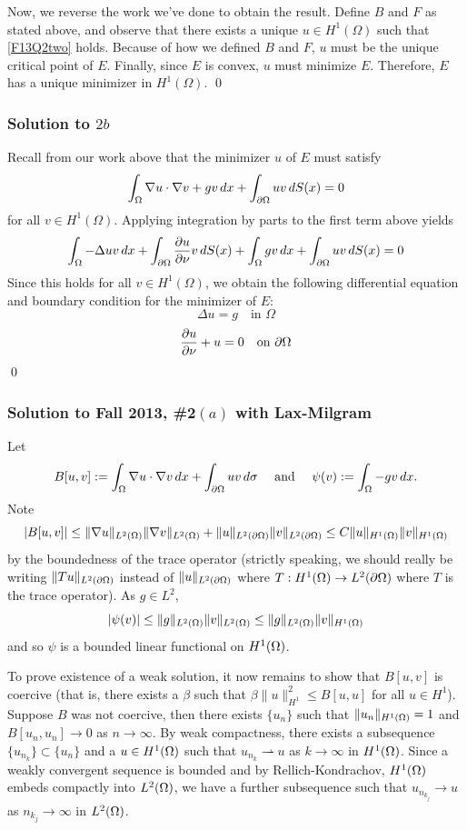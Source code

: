 Now, we reverse the work we've done to obtain the result. Define $B$ and $F$ as stated above, and observe that there exists a unique $u \in H^1(\Omega)$ such that \eqref{F13Q2two} holds. Because of how we defined $B$ and $F$, $u$ must be the unique critical point of $E$. Finally, since $E$ is convex, $u$ must minimize $E$. Therefore, $E$ has a unique minimizer in $H^1(\Omega)$.  \hfill \qed

\subsubsection*{Solution to $2b$}

Recall from our work above that the minimizer $u$ of $E$ must satisfy
$$ \int_{\Omega} \nabla u \cdot \nabla v + gv \,dx + \int_{\partial \Omega} u v \, dS(x) = 0 $$
for all $v \in H^1(\Omega)$. Applying integration by parts to the first term above yields
$$ \int_{\Omega} -\Delta u v \, dx + \int_{\partial \Omega} \frac{\partial u}{\partial \nu} v \, dS(x) + \int_{\Omega} gv \, dx + \int_{\partial \Omega} uv \, dS(x) = 0 $$
Since this holds for all $v \in H^1(\Omega)$, we obtain the following differential equation and boundary condition for the minimizer of $E$:
$$ \Delta u = g \quad \text{in} \,\, \Omega $$
$$ \frac{\partial u}{\partial \nu} + u = 0 \quad \text{on} \,\, \partial \Omega $$
\hfill \qed

\subsubsection*{Solution to Fall 2013, \#2$(a)$ with Lax-Milgram}
Let
\begin{align*}
B[u, v] := \int_{\Omega}\nabla u \cdot \nabla v\, dx + \int_{\partial \Omega}uv\, d\sigma \quad \text{ and } \quad \psi(v) := \int_{\Omega} -g v\, dx.
\end{align*}
Note
$$|B[u, v]| \leq \| \nabla u \|_{L^{2}(\Omega)}\| \nabla v \|_{L^{2}(\Omega)} + \|u\|_{L^{2}(\partial \Omega)}\|v\|_{L^{2}(\partial \Omega)} \leq C\|u\|_{H^{1}(\Omega)}\|v\|_{H^{1}(\Omega)}$$
by the boundedness of the trace operator (strictly speaking, we should really be writing $\|Tu\|_{L^{2}(\partial \Omega)}$ instead of $\|u\|_{L^{2}(\partial \Omega)}$ where
$T: H^{1}(\Omega) \rightarrow L^{2}(\partial \Omega)$ where $T$ is the trace operator). As $g \in L^{2}$,
$$|\psi(v)| \leq \|g\|_{L^{2}(\Omega)}\|v\|_{L^{2}(\Omega)} \leq \|g\|_{L^{2}(\Omega)}\|v\|_{H^{1}(\Omega)}$$
and so $\psi$ is a bounded linear functional on $H^{1}(\Omega)$.

To prove existence of a weak solution, it now remains to show that $B[u, v]$ is coercive (that is, there exists a $\beta$ such that
$\beta \|u\|_{H^{1}}^{2} \leq B[u, u]$ for all $u \in H^{1}$). Suppose $B$ was not coercive, then there exists
$\{u_{n}\}$ such that $\| u_{n} \|_{H^{1}(\Omega)} = 1$ and $B[u_{n}, u_{n}] \rightarrow 0$ as $n \rightarrow \infty$.
By weak compactness, there exists a subsequence $\{u_{n_{k}}\} \subset \{u_{n}\}$ and a $u \in H^{1}(\Omega)$ such that
$u_{n_{k}} \rightharpoonup u$ as $k \rightarrow \infty$ in $H^{1}(\Omega)$. Since a weakly convergent sequence is bounded and by
Rellich-Kondrachov, $H^{1}(\Omega)$ embeds compactly into $L^{2}(\Omega)$, we have a further subsequence such that
$u_{n_{k_{j}}} \rightarrow u$ as $n_{k_{j}} \rightarrow \infty$ in $L^{2}(\Omega)$.

